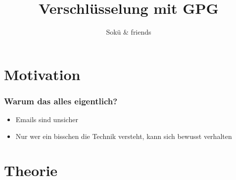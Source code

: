 \documentclass[compress]{beamer}
\begin{document}
\title{Verschlüsselung mit GPG}  
\author{Sokü \& friends}
\date{} 

\frame{\titlepage} 


\section{Motivation}
\label{sec:motivation}

\begin{frame}
  \frametitle{Warum das alles eigentlich?}

  \begin{itemize}[<+(1)->]
  \item Emails sind unsicher
  \item Nur wer ein bisschen die Technik versteht, kann sich bewusst
    verhalten
  \end{itemize}
\end{frame}

\section{Theorie}
\label{sec:theorie}
\end{document}
